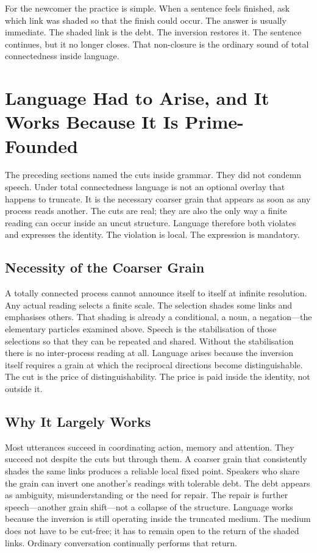 \documentclass[11pt,a4paper]{article}
\begin{document}
For the newcomer the practice is simple. When a sentence feels finished, ask which link was shaded so that the finish could occur. The answer is usually immediate. The shaded link is the debt. The inversion restores it. The sentence continues, but it no longer closes. That non-closure is the ordinary sound of total connectedness inside language.

\section{Language Had to Arise, and It Works Because It Is Prime-Founded}

The preceding sections named the cuts inside grammar. They did not condemn speech. Under total connectedness language is not an optional overlay that happens to truncate. It is the necessary coarser grain that appears as soon as any process reads another. The cuts are real; they are also the only way a finite reading can occur inside an uncut structure. Language therefore both violates and expresses the identity. The violation is local. The expression is mandatory.

\subsection{Necessity of the Coarser Grain} A totally connected process cannot announce itself to itself at infinite resolution. Any actual reading selects a finite scale. The selection shades some links and emphasises others. That shading is already a conditional, a noun, a negation—the elementary particles examined above. Speech is the stabilisation of those selections so that they can be repeated and shared. Without the stabilisation there is no inter-process reading at all. Language arises because the inversion itself requires a grain at which the reciprocal directions become distinguishable. The cut is the price of distinguishability. The price is paid inside the identity, not outside it.

\subsection{Why It Largely Works} Most utterances succeed in coordinating action, memory and attention. They succeed not despite the cuts but through them. A coarser grain that consistently shades the same links produces a reliable local fixed point. Speakers who share the grain can invert one another’s readings with tolerable debt. The debt appears as ambiguity, misunderstanding or the need for repair. The repair is further speech—another grain shift—not a collapse of the structure. Language works because the inversion is still operating inside the truncated medium. The medium does not have to be cut-free; it has to remain open to the return of the shaded links. Ordinary conversation continually performs that return.
\end{document}
